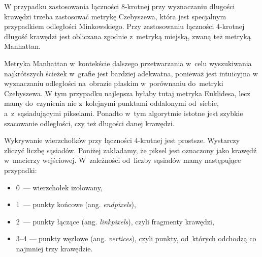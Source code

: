 \documentclass[a4paper,11pt,twoside,openright]{report}
\theoremstyle{definition}
\begin{document}

W przypadku zastosowania łączności 8-krotnej przy wyznaczaniu długości krawędzi
trzeba zastosować metrykę Czebyszewa, która jest specjalnym przypadkiem
odległości Minkowskiego. Przy zastosowaniu łączności 4-krotnej długość krawędzi
jest obliczana zgodnie z~metryką miejską, zwaną też metryką Manhattan.

Metryka Manhattan w~kontekście dalszego przetwarzania w~celu wyszukiwania
najkrótszych ścieżek w~grafie jest bardziej adekwatna, ponieważ jest intuicyjna
w wyznaczaniu odległości na~obrazie płaskim w~porównaniu do~metryki Czebyszewa.
W tym przypadku najlepsza byłaby tutaj metryka Euklidesa, lecz mamy do~czynienia
nie z~kolejnymi punktami oddalonymi od~siebie, a~z~sąsiadującymi pikselami.
Ponadto w~tym algorytmie istotne jest szybkie szacowanie odległości, czy też
długości danej krawędzi.

Wykrywanie wierzchołków przy łączności 4-krotnej jest prostsze. Wystarczy zliczyć
liczbę sąsiadów. Poniżej zakładamy, że piksel jest oznaczony jako krawędź w~macierzy
wejściowej. W~zależności od~liczby sąsiadów mamy następujące przypadki:
\begin{itemize}[noitemsep]
\item 0~--- wierzchołek izolowany,
\item 1~--- punkty końcowe (ang. \textit{endpixels}),
\item 2~--- punkty łączące (ang. \textit{linkpixels}), czyli fragmenty krawędzi,
\item 3--4 --- punkty węzłowe (ang. \textit{vertices}), czyli punkty, od~których odchodzą
co najmniej trzy krawędzie.
\end{itemize}
\end{document}
